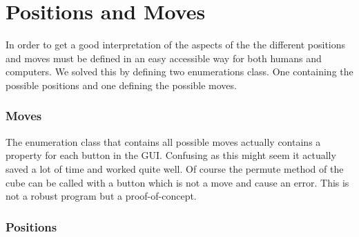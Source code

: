 \section{Positions and Moves}
In order to get a good interpretation of the aspects of the \cube{} the different positions and moves must be defined in an easy accessible way for both humans and computers. We solved this by defining two enumerations class. One containing the possible positions and one defining the possible moves. 

\subsubsection{Moves}
The enumeration class that contains all possible moves actually contains a property for each button in the GUI. Confusing as this might seem it actually saved a lot of time and worked quite well. Of course the permute method of the cube can be called with a button which is not a move and cause an error. This is not a robust program but a proof-of-concept. 

\subsubsection{Positions}

